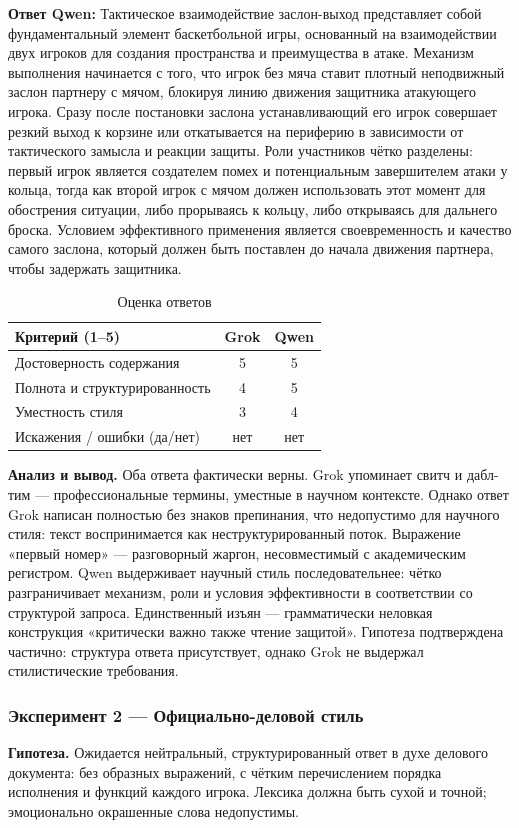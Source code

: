 \documentclass[a4paper, final]{article}
\newcommand{\scoretablefilled}[8]{%
    \vspace{4pt}
    \begin{table}[h!]
    \centering
    \small
    \begin{tabular}{|l|c|c|}
    \hline
    \textbf{Критерий (1--5)} & \textbf{Grok} & \textbf{Qwen} \\
    \hline
    Достоверность содержания & #1 & #2 \\
    \hline
    Полнота и структурированность & #3 & #4 \\
    \hline
    Уместность стиля & #5 & #6 \\
    \hline
    Искажения / ошибки (да/нет) & #7 & #8 \\
    \hline
    \end{tabular}
    \caption{Оценка ответов}
    \end{table}
    \vspace{2pt}
}
\begin{document}
\noindent\textbf{Ответ Qwen:} Тактическое взаимодействие заслон-выход представляет собой фундаментальный элемент баскетбольной игры, основанный на взаимодействии двух игроков для создания пространства и преимущества в атаке. Механизм выполнения начинается с того, что игрок без мяча ставит плотный неподвижный заслон партнеру с мячом, блокируя линию движения защитника атакующего игрока. Сразу после постановки заслона устанавливающий его игрок совершает резкий выход к корзине или откатывается на периферию в зависимости от тактического замысла и реакции защиты. Роли участников чётко разделены: первый игрок является создателем помех и потенциальным завершителем атаки у кольца, тогда как второй игрок с мячом должен использовать этот момент для обострения ситуации, либо прорываясь к кольцу, либо открываясь для дальнего броска. Условием эффективного применения является своевременность и качество самого заслона, который должен быть поставлен до начала движения партнера, чтобы задержать защитника.

\scoretablefilled{5}{5}{4}{5}{3}{4}{нет}{нет}

\noindent\textbf{Анализ и вывод.} Оба ответа фактически верны. Grok упоминает свитч и дабл-тим — профессиональные термины, уместные в научном контексте. Однако ответ Grok написан полностью без знаков препинания, что недопустимо для научного стиля: текст воспринимается как неструктурированный поток. Выражение «первый номер» — разговорный жаргон, несовместимый с академическим регистром. Qwen выдерживает научный стиль последовательнее: чётко разграничивает механизм, роли и условия эффективности в соответствии со структурой запроса. Единственный изъян — грамматически неловкая конструкция «критически важно также чтение защитой». Гипотеза подтверждена частично: структура ответа присутствует, однако Grok не выдержал стилистические требования.

\newpage

\subsubsection{Эксперимент 2 — Официально-деловой стиль}

\noindent\textbf{Гипотеза.} Ожидается нейтральный, структурированный ответ в духе делового документа: без образных выражений, с чётким перечислением порядка исполнения и функций каждого игрока. Лексика должна быть сухой и точной; эмоционально окрашенные слова недопустимы.
\end{document}
